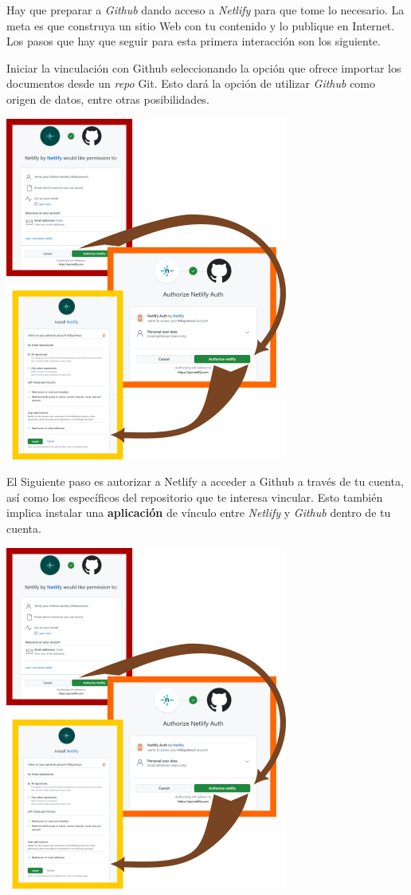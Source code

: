 \documentclass[
  letterpaper,
  DIV=11,
  numbers=noendperiod]{scrartcl}
\begin{document}
Hay que preparar a \emph{Github} dando acceso a \emph{Netlify} para que
tome lo necesario. La meta es que construya un sitio Web con tu
contenido y lo publique en Internet. Los pasos que hay que seguir para
esta primera interacción son los siguiente.

Iniciar la vinculación con Github seleccionando la opción que ofrece
importar los documentos desde un \emph{repo} Git. Esto dará la opción de
utilizar \emph{Github} como origen de datos, entre otras posibilidades.

\includegraphics{images/Netlify-1.png}

El Siguiente paso es autorizar a Netlify a acceder a Github a través de
tu cuenta, así como los específicos del repositorio que te interesa
vincular. Esto también implica instalar una \textbf{aplicación} de
vínculo entre \emph{Netlify} y \emph{Github} dentro de tu cuenta.

\includegraphics{images/Netlify-2.png}
\end{document}
